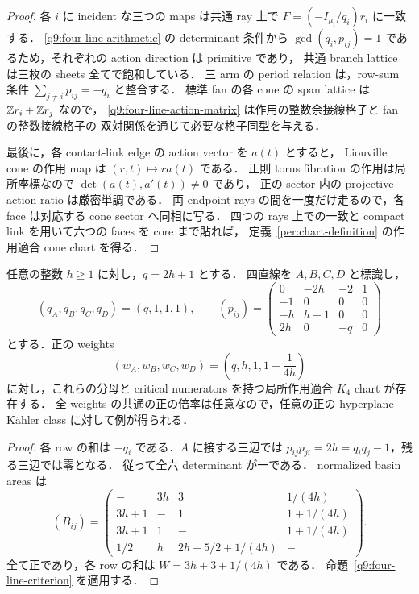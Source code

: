 \begin{proof}
各 $i$ に incident な三つの maps は共通 ray 上で
$F=(-I_{\mu_i}/q_i)r_i$ に一致する．
\eqref{q9:four-line-arithmetic} の determinant 条件から
$\gcd(q_i,p_{ij})=1$ であるため，それぞれの action direction は primitive であり，
共通 branch lattice は三枚の sheets 全てで飽和している．
三 arm の period relation は，row-sum 条件 $\sum_{j\ne i}p_{ij}=-q_i$ と整合する．
標準 fan の各 cone の span lattice は $\mathbb Z r_i+\mathbb Z r_j$ なので，
\eqref{q9:four-line-action-matrix} は作用の整数余接線格子と fan の整数接線格子の
双対関係を通じて必要な格子同型を与える．

最後に，各 contact-link edge の action vector を $a(t)$ とすると，
Liouville cone の作用 map は $(r,t)\mapsto r a(t)$ である．
正則 torus fibration の作用は局所座標なので $\det(a(t),a'(t))\ne0$ であり，
正の sector 内の projective action ratio は厳密単調である\cite[Remarks 2.11--2.12]{EM}．
両 endpoint rays の間を一度だけ走るので，各 face は対応する cone sector へ同相に写る．
四つの rays 上での一致と compact link を用いて六つの faces を core まで貼れば，
定義~\ref{per:chart-definition} の作用適合 cone chart を得る．
\end{proof}

\begin{corollary}\label{q9:local-all-odd}
任意の整数 $h\geq1$ に対し，$q=2h+1$ とする．
四直線を $A,B,C,D$ と標識し，
\[
 (q_A,q_B,q_C,q_D)=(q,1,1,1),\qquad
 (p_{ij})=
 \begin{pmatrix}
 0&-2h&-2&1\\
 -1&0&0&0\\
 -h&h-1&0&0\\
 2h&0&-q&0
 \end{pmatrix}
\]
とする．正の weights
\begin{equation}\label{q9:local-all-odd-weights}
 (w_A,w_B,w_C,w_D)=\left(q,h,1,1+\frac1{4h}\right)
\end{equation}
に対し，これらの分母と critical numerators を持つ局所作用適合 $K_4$ chart が存在する．
全 weights の共通の正の倍率は任意なので，任意の正の hyperplane Kähler class に対して例が得られる．
\end{corollary}

\begin{proof}
各 row の和は $-q_i$ である．$A$ に接する三辺では
$p_{ij}p_{ji}=2h=q_iq_j-1$，残る三辺では零となる．
従って全六 determinant が一である．
normalized basin areas は
\[
 (B_{ij})=
 \begin{pmatrix}
 -&3h&3&1/(4h)\\
 3h+1&-&1&1+1/(4h)\\
 3h+1&1&-&1+1/(4h)\\
 1/2&h&2h+5/2+1/(4h)&-
 \end{pmatrix}.
\]
全て正であり，各 row の和は $W=3h+3+1/(4h)$ である．
命題~\ref{q9:four-line-criterion} を適用する．
\end{proof}

